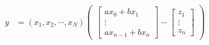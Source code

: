   \begin{align}
    y &= (x_{1},x_{2},\cdots, x_{N})
        \begin{pmatrix}
          \begin{bmatrix}
           ax_{0} + bx_{1} \\           
           \vdots \\
           ax_{n-1}+bx_{n}
          \end{bmatrix} -
          \begin{bmatrix}
           z_{1} \\
           \vdots \\
           z_{n}
         \end{bmatrix}
    \end{pmatrix}
  \end{align}